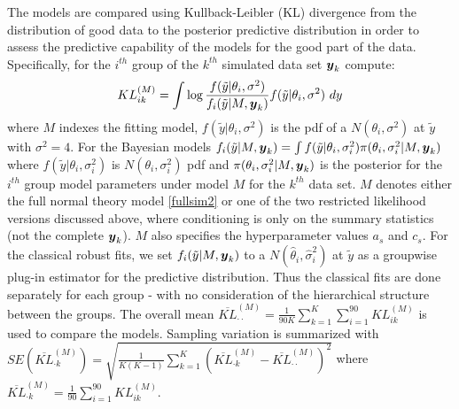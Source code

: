 \documentclass[12pt]{article}
\newcommand{\by}{\mbox{\boldmath $y$}}
\begin{document}
The models are compared using Kullback-Leibler (KL) divergence from the distribution of good data to the posterior predictive distribution in order to assess the predictive capability of the models for the good part of the data. Specifically, for the $i^{th}$ group of the $k^{th}$ simulated data set $\by_{k}$ compute:
\begin{equation}
\label{kl}
KL^{(M)}_{ik} = \int \log \frac{f(\tilde y | \theta_{i}, \sigma^{2})}{f_{i}(\tilde y | M, \by_{k})}  f(\tilde y | \theta_{i}, \sigma^{2}) \ dy
\end{equation}
where $M$ indexes the fitting model, $f(\tilde y | \theta_{i}, \sigma^{2})$ is the pdf of a $N(\theta_{i}, \sigma^{2})$ at $\tilde y$ with $\sigma^{2} = 4$. For the Bayesian models ${f_{i}(\tilde y | M, \by_{k})} = \int f(\tilde y |\theta_{i}, \sigma_{i}^{2}) \pi(\theta_{i}, \sigma^{2}_{i} | M, \by_{k})$ where $ f(\tilde y |\theta_{i}, \sigma_{i}^{2})$ is  $N(\theta_{i}, \sigma_{i}^{2})$ pdf and  $\pi(\theta_{i}, \sigma^{2}_{i} | M, \by_{k})$ is the posterior for the $i^{th}$ group model parameters under model $M$ for the $k^{th}$ data set. $M$ denotes either the full normal theory model \eqref{fullsim2} or one of the two restricted likelihood versions discussed above, where conditioning is only on the summary statistics (not the complete $\by_{k}$). $M$ also specifies the hyperparameter values $a_{s}$ and $c_{s}$. For the classical robust fits, we set $f_{i}(\tilde y | M, \by_{k})$ to a $N(\hat\theta_{i}, \hat\sigma^{2}_{i})$ at  $\tilde y$ as a groupwise plug-in estimator for the predictive distribution. Thus the classical fits are done separately for each group - with no consideration of the hierarchical structure between the groups. The overall mean $\overline{KL}^{(M)}_{{\cdot}{\cdot}} = \frac{1}{90K} \sum_{k = 1}^{K} \sum_{i=1}^{90} KL^{(M)}_{ik}$ is used to compare the models. Sampling variation is summarized with $SE(\overline{KL}^{(M)}_{{\cdot} k}) = \sqrt{\frac{1}{K(K-1)}\sum_{k = 1}^{K} (\overline{KL}^{(M)}_{{\cdot} k} - \overline{KL}^{(M)}_{{\cdot}{\cdot}})^{2}}$ where $\overline{KL}^{(M)}_{{\cdot} k} = \frac{1}{90}\sum_{i = 1}^{90} KL^{(M)}_{ik}$.
 
\end{document}
